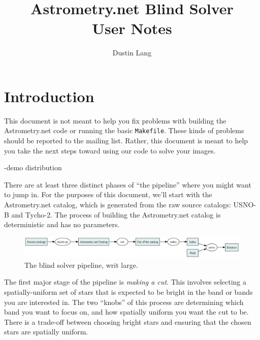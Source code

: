 \documentclass[12pt,letterpaper,titlepage]{article}
\newcommand{\an}{Astrometry.net}
\newcommand{\code}[1]{\texttt{#1}}
\begin{document}
\title{Astrometry.net Blind Solver \\ User Notes}
\author{Dustin Lang}

\maketitle

\newpage

\section{Introduction}

This document is not meant to help you fix problems with building the \an{} code or 
running the basic \code{Makefile}.  These kinds of problems should be reported to the
mailing list.  Rather, this document is meant to help you take the next steps toward
using our code to solve your images.


-demo distribution

There are at least three distinct phases of ``the pipeline'' where you might want to
jump in.  For the purposes of this document, we'll start with the Astrometry.net catalog,
which is generated from the raw source catalogs: USNO-B and Tycho-2.  The
process of building the Astrometry.net catalog is deterministic and has no parameters.

\begin{figure}[h!]
\begin{center}
\includegraphics[width=\textwidth]{userdoc-fig-pipeline}
\caption{The blind solver pipeline, writ large.}
\label{fig-pipeline}
\end{center}
\end{figure}

The first major stage of the pipeline is \emph{making a cut}.  This involves selecting a 
spatially-uniform set of stars that is expected to be bright in the band or bands you are
interested in.  The two ``knobs'' of this process are determining which band you want to focus
on, and how spatially uniform you want the cut to be.  There is a trade-off between choosing bright
stars and ensuring that the chosen stars are spatially uniform.
\end{document}
